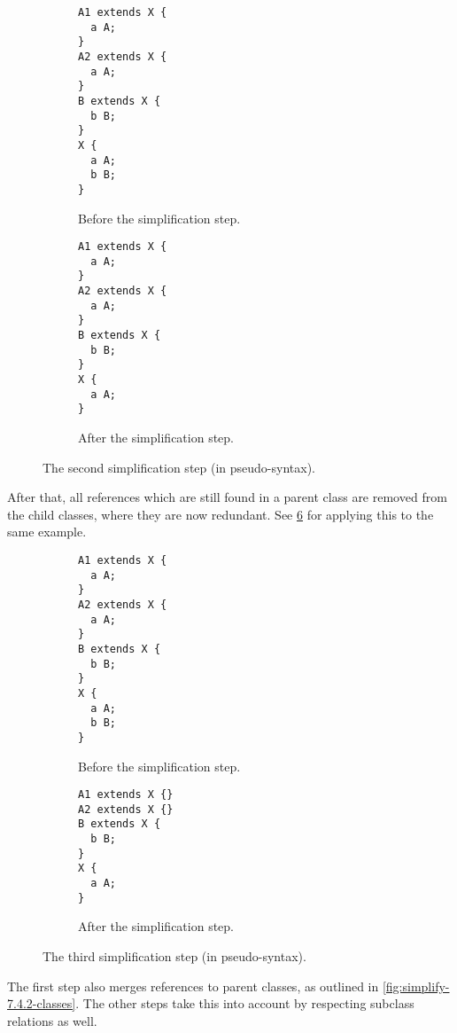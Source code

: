 \begin{figure}[h]
  \begin{subfigure}[t]{0.45\textwidth}
    \begin{lstlisting}
A1 extends X {
  a A;
}
A2 extends X {
  a A;
}
B extends X {
  b B;
}
X {
  a A;
  b B;
}
    \end{lstlisting}
    \caption{Before the simplification step.}
    \label{fig:simplify-7.4.3-before}
  \end{subfigure}
  \begin{subfigure}[t]{0.45\textwidth}
    \begin{lstlisting}
A1 extends X {
  a A;
}
A2 extends X {
  a A;
}
B extends X {
  b B;
}
X {
  a A;
}
    \end{lstlisting}
    \caption{After the simplification step.}
    \label{fig:simplify-7.4.3-after}
  \end{subfigure}
  \caption{The second simplification step (in pseudo-syntax).}
  \label{fig:simplify-7.4.3}
\end{figure}

After that, all references which are still found in a parent class
are removed from the child classes, where they are now redundant.
See \cref{fig:simplify-7.4.4} for applying this to the same example.

\begin{figure}[h]
  \begin{subfigure}[t]{0.45\textwidth}
    \begin{lstlisting}
A1 extends X {
  a A;
}
A2 extends X {
  a A;
}
B extends X {
  b B;
}
X {
  a A;
  b B;
}
    \end{lstlisting}
    \caption{Before the simplification step.}
    \label{fig:simplify-7.4.4-before}
  \end{subfigure}
  \begin{subfigure}[t]{0.45\textwidth}
    \begin{lstlisting}
A1 extends X {}
A2 extends X {}
B extends X {
  b B;
}
X {
  a A;
}
    \end{lstlisting}
    \caption{After the simplification step.}
    \label{fig:simplify-7.4.4-after}
  \end{subfigure}
  \caption{The third simplification step (in pseudo-syntax).}
  \label{fig:simplify-7.4.4}
\end{figure}

The first step also merges references to parent classes,
as outlined in \cref{fig:simplify-7.4.2-classes}.
The other steps take this into account by respecting subclass relations as well.

